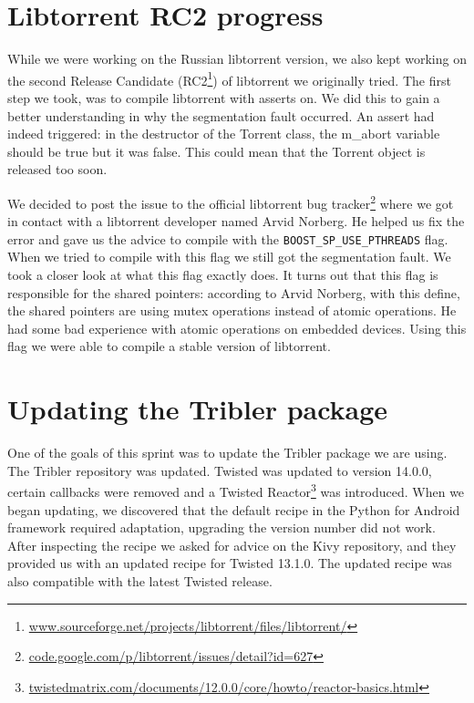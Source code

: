 	\section{Libtorrent RC2 progress}
		While we were working on the Russian libtorrent version, we also kept working on the second Release Candidate (RC2\footnote{\href{http://sourceforge.net/projects/libtorrent/files/libtorrent/}{www.sourceforge.net/projects/libtorrent/files/libtorrent/}}) of libtorrent we originally tried. The first step we took, was to compile libtorrent with asserts on. We did this to gain a better understanding in why the segmentation fault occurred. An assert had indeed triggered: in the destructor of the Torrent class, the m\_abort variable should be true but it was false. This could mean that the Torrent object is released too soon.
		
		We decided to post the issue to the official libtorrent bug tracker\footnote{\href{https://code.google.com/p/libtorrent/issues/detail?id=627}{code.google.com/p/libtorrent/issues/detail?id=627}} where we got in contact with a libtorrent developer named Arvid Norberg. He helped us fix the error and gave us the advice to compile with the \texttt{BOOST\_SP\_USE\_PTHREADS} flag. When we tried to compile with this flag we still got the segmentation fault. We took a closer look at what this flag exactly does. It turns out that this flag is responsible for the shared pointers: according to Arvid Norberg, with this define, the shared pointers are using mutex operations instead of atomic operations. He had some bad experience with atomic operations on embedded devices. Using this flag we were able to compile a stable version of libtorrent.
				
	\section{Updating the Tribler package}
		One of the goals of this sprint was to update the Tribler package we are using. The Tribler repository was updated. Twisted was updated to version 14.0.0, certain callbacks were removed and a Twisted Reactor\footnote{\href{https://twistedmatrix.com/documents/12.0.0/core/howto/reactor-basics.html}{twistedmatrix.com/documents/12.0.0/core/howto/reactor-basics.html}} was introduced.
		When we began updating, we discovered that the default recipe in the Python for Android framework required adaptation, upgrading the version number did not work. After inspecting the recipe we asked for advice on the Kivy repository, and they provided us with an updated recipe for Twisted 13.1.0. The updated recipe was also compatible with the latest Twisted release.
		
